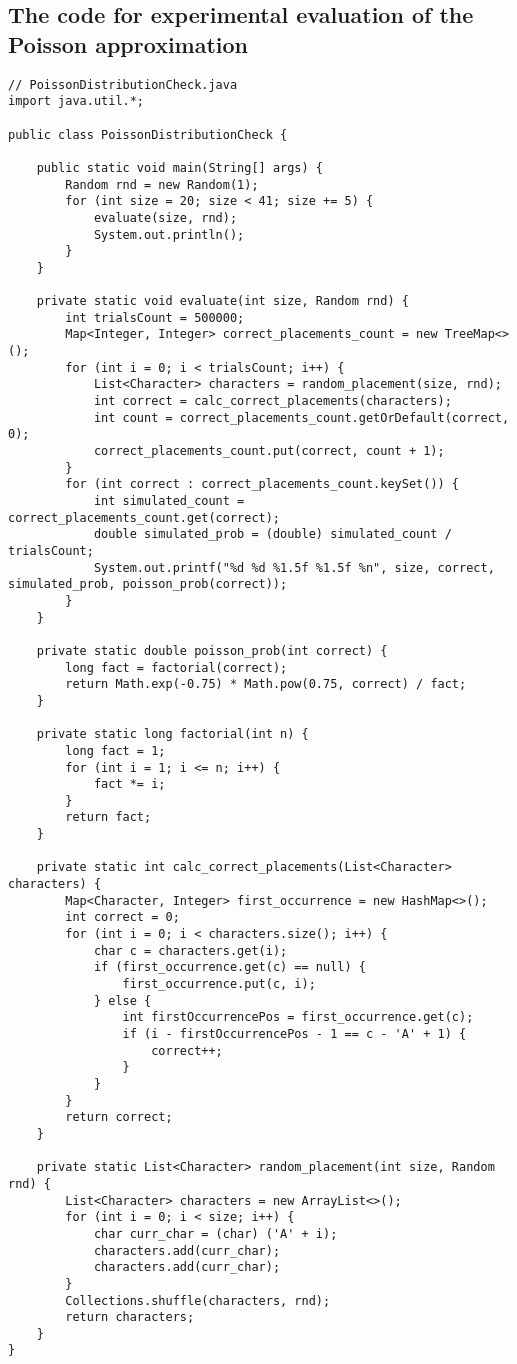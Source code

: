 \documentclass{article}
\begin{document}
\clearpage

\subsection{The code for experimental evaluation of the Poisson approximation} \label{poisson-approximation-code}

\begin{lstlisting}
// PoissonDistributionCheck.java
import java.util.*;

public class PoissonDistributionCheck {

	public static void main(String[] args) {
		Random rnd = new Random(1);
		for (int size = 20; size < 41; size += 5) {
			evaluate(size, rnd);
			System.out.println();
		}
	}

	private static void evaluate(int size, Random rnd) {
		int trialsCount = 500000;
		Map<Integer, Integer> correct_placements_count = new TreeMap<>();
		for (int i = 0; i < trialsCount; i++) {
			List<Character> characters = random_placement(size, rnd);
			int correct = calc_correct_placements(characters);
			int count = correct_placements_count.getOrDefault(correct, 0);
			correct_placements_count.put(correct, count + 1);
		}
		for (int correct : correct_placements_count.keySet()) {
			int simulated_count = correct_placements_count.get(correct);
			double simulated_prob = (double) simulated_count / trialsCount;
			System.out.printf("%d %d %1.5f %1.5f %n", size, correct, simulated_prob, poisson_prob(correct));
		}
	}

	private static double poisson_prob(int correct) {
		long fact = factorial(correct);
		return Math.exp(-0.75) * Math.pow(0.75, correct) / fact;
	}

	private static long factorial(int n) {
		long fact = 1;
		for (int i = 1; i <= n; i++) {
			fact *= i;
		}
		return fact;
	}

	private static int calc_correct_placements(List<Character> characters) {
		Map<Character, Integer> first_occurrence = new HashMap<>();
		int correct = 0;
		for (int i = 0; i < characters.size(); i++) {
			char c = characters.get(i);
			if (first_occurrence.get(c) == null) {
				first_occurrence.put(c, i);
			} else {
				int firstOccurrencePos = first_occurrence.get(c);
				if (i - firstOccurrencePos - 1 == c - 'A' + 1) {
					correct++;
				}
			}
		}
		return correct;
	}

	private static List<Character> random_placement(int size, Random rnd) {
		List<Character> characters = new ArrayList<>();
		for (int i = 0; i < size; i++) {
			char curr_char = (char) ('A' + i);
			characters.add(curr_char);
			characters.add(curr_char);
		}
		Collections.shuffle(characters, rnd);
		return characters;
	}
}

\end{lstlisting}
\end{document}
